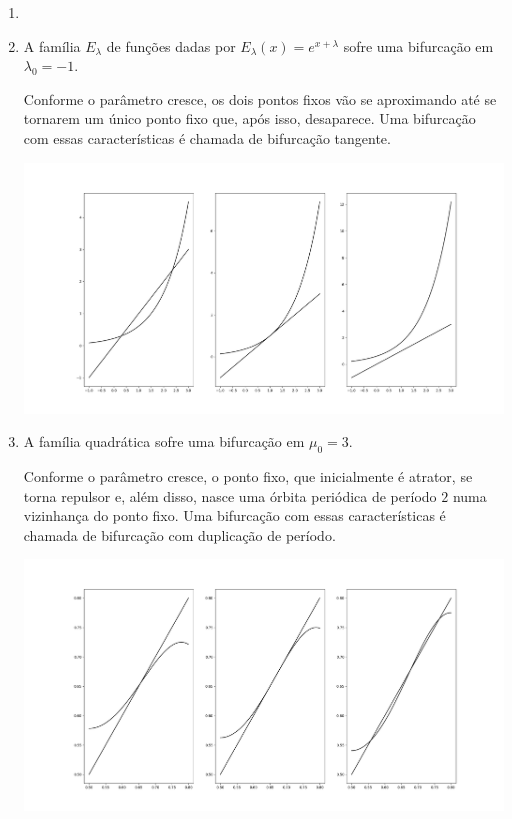 \begin{example}
\begin{enumerate}[label=\alph*)]\item[]
\item 
A família $E_\lambda$ de funções dadas por $E_\lambda(x) = e^{x + \lambda}$ sofre uma bifurcação em $\lambda_0 = -1$.

Conforme o parâmetro cresce, os dois pontos fixos vão se aproximando até se tornarem um único ponto fixo que, após isso, desaparece. Uma bifurcação com essas características é chamada de bifurcação tangente.
\begin{center}
\includegraphics[scale=0.3]{images/e_lambda.png}
\end{center}

\item A família quadrática sofre uma bifurcação em $\mu_0 = 3$.

Conforme o parâmetro cresce, o ponto fixo, que inicialmente é atrator, se torna repulsor e, além disso, nasce uma órbita periódica de período $2$ numa vizinhança do ponto fixo. Uma bifurcação com essas características é chamada de bifurcação com duplicação de período.
\begin{center}
\includegraphics[scale=0.3]{images/h_mu^2.png}
\end{center}
\end{enumerate}
\end{example}

